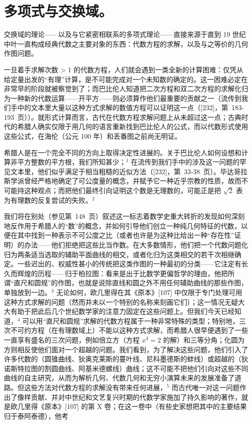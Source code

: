 \chapter{多项式与交换域。}

交换域的理论——以及与它紧密相联系的多项式理论——直接来源于直到 19 世纪中叶一直构成经典代数之主要对象的东西：代数方程的求解，以及与之等价的几何作图问题。

一旦着手求解次数 \textgreater{} 1 的代数方程，人们就会遇到一类全新的计算困难：仅凭从给定量出发的“有理”计算，是不可能完成对一个未知数的确定的。这一困难必定在非常早的阶段就被察觉到了；而巴比伦人知道把二次方程和双二次方程的求解化归为一种新的代数运算——开平方——则必须算作他们最重要的贡献之一（流传到我们手中的文本里大量以这种方式求解的数值方程可以证明这一点（{[}232{]}，第~183-193~页））。就形式计算而言，古代在代数方程求解问题上从未超过这一点；古典时代的希腊人确实仅限于用几何的语言重新找到巴比伦人的公式，而以代数形式使用这些公式，在海伦（公元 100 年）和丢番图之前尚无明证。

希腊人是在一个完全不同的方向上取得决定性进展的。关于巴比伦人如何设想和计算非平方整数的平方根，我们所知甚少；\(^{1}\) 在流传到我们手中的涉及这一问题的罕见文本里，他们似乎满足于相当粗糙的近似方法（{[}232{]}，第~33-38~页）。毕达哥拉斯学派曾经严格地确定了可公度量的概念，并赋予它一种近乎宗教的性质，故而不可能持这种观点；而把他们最终引向证明这个数是无理数的，可能正是把 \(\sqrt{2}\) 表为有理数的反复尝试的失败。\(^{2}\)

我们将在别处（参见第~148~页）叙述这一标志着数学史重大转折的发现如何深刻地反作用于希腊人的“数”的概念，并如何引导他们创立一种纯几何特征的代数，以便在其中找到一种表示不可公度之比（或者也许是为这种比给出一种“存在性”证明）的办法——他们拒绝把这些比当作数。在大多数情形，他们把一个代数问题化归为两条适当选取的辅助平面曲线的相交，或者化归为这类相交的若干次相继确定。一些迟出的、权威性甚小的传统把这类作图的一种最初的分类——它注定有长久而辉煌的历程——归于柏拉图：看来是出于比数学更偏哲学的理由，他把所谓“直尺和圆规”的作图，也就是说除直线和圆之外不用任何辅助曲线的那些作图，单独放到一边。\(^{3}\) 无论如何，欧几里得在其《原本》{[}107{]} 中仅限于专门处理可用这种方式求解的问题（然而并未以一个特别的名称来刻画它们）；这一情况无疑大大有助于把此后几个世纪数学家的注意力固定在这些问题上。但我们今天已经知道，\(^{4}\) 可以用“直尺和圆规”求解的代数方程属于一种非常特殊的类型；特别地，三次不可约方程（在有理数域上）不能以这种方式求解，而希腊人很早便遇到了一些一直享有盛名的三次问题，例如倍立方（方程 \(x^{3}=2\) 的解）和三等分角；化圆为方则相反使他们面对一个超越的问题。我们看到，为了解决这些问题，他们引入了许多代数的（圆锥曲线、狄奥克莱斯的蔓叶线、尼科墨德斯的蚌线）或超越的（狄诺斯特拉图的割圆曲线、阿基米德螺线）曲线；这不可能不把他们引向对这些不同曲线的自主研究，从而为解析几何、代数几何和无穷小演算未来的发展准备了道路。但这些方法对代数方程的求解没有带来任何进展，\(^{5}\) 而古代唯一对这一问题作出了像样贡献、并对中世纪和文艺复兴时期的代数学家施加了持久影响的著作，就是欧几里得《原本》{[}107{]} 的第 X 卷；在这一卷中（有些史家想把其中的主要结果归于泰阿泰德），他考

